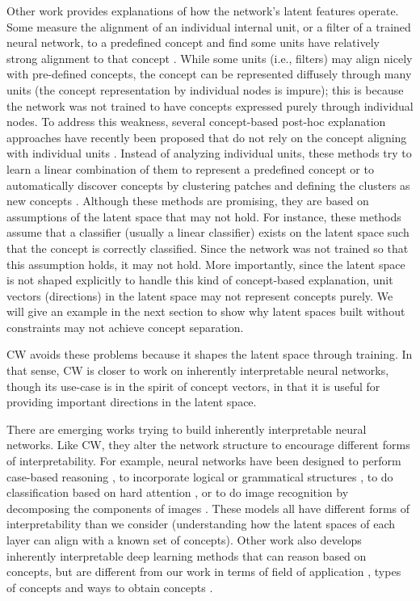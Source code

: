 \documentclass{article}
\begin{document}
Other work provides explanations of how the network's latent features operate. Some measure the alignment of an individual internal unit, or a filter of a trained neural network, to a predefined concept and find some units have relatively strong alignment to that concept \cite{zhou2018interpreting,zhou2014object}. While some units (i.e., filters) may align nicely with pre-defined concepts, the concept can be represented diffusely through many units (the concept representation by individual nodes is impure); this is because the network was not trained to have concepts expressed purely through individual nodes. To address this weakness, several concept-based post-hoc explanation approaches have recently been proposed that do not rely on the concept aligning with individual units \cite{kim2018interpretability,zhou2018interpretable,ghorbani2019towards,yeh2019concept}. Instead of analyzing individual units, these methods try to learn a linear combination of them to represent a predefined concept \cite{kim2018interpretability} or to automatically discover concepts by clustering patches and defining the clusters as new concepts \cite{ghorbani2019towards}. Although these methods are promising, they are based on assumptions of the latent space that may not hold. For instance, these methods assume that a classifier (usually a linear classifier) exists on the latent space such that the concept is correctly classified. Since the network was not trained so that this assumption holds, it may not hold. More importantly, since the latent space is not shaped explicitly to handle this kind of concept-based explanation, unit vectors (directions) in the latent space may not represent concepts purely. We will give an example in the next section to show why latent spaces built without constraints may not achieve concept separation.

CW avoids these problems because it shapes the latent space through training. In that sense, CW is closer to work on inherently interpretable neural networks, though its use-case is in the spirit of concept vectors, in that it is useful for providing important directions in the latent space.

There are emerging works trying to build inherently interpretable neural networks. Like CW, they alter the network structure to encourage different forms of interpretability. For example, neural networks have been designed to perform case-based reasoning \cite{chen2019looks, li2018deep}, to incorporate logical or grammatical structures \cite{li2017aognets, granmo2019convolutional,wu2019towards}, to do classification based on hard attention \cite{mnih2014recurrent, ba2014multiple,sermanet2014attention,elsayed2019saccader}, or to do image recognition by decomposing the components of images \cite{saralajew2019classification}. These models all have different forms of interpretability than we consider (understanding how the latent spaces of each layer can align with a known set of concepts). Other work also develops inherently interpretable deep learning methods that can reason based on concepts, but are different from our work in terms of field of application \cite{bouchacourt2019educe}, types of concepts \cite{zhang2018interpretable,zhang2018unsupervised} and ways to obtain concepts \cite{adel2018discovering}.
\end{document}
